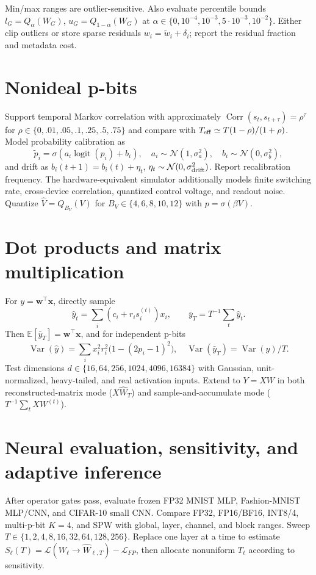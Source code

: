 \documentclass[11pt]{article}
\newcommand{\E}{\mathbb{E}}
\newcommand{\Var}{\operatorname{Var}}
\begin{document}
Min/max ranges are outlier-sensitive. Also evaluate percentile bounds $l_G=Q_\alpha(W_G)$,
$u_G=Q_{1-\alpha}(W_G)$ at $\alpha\in\{0,10^{-4},10^{-3},5\cdot10^{-3},10^{-2}\}$.
Either clip outliers or store sparse residuals $w_i=\tilde w_i+\delta_i$; report the
residual fraction and metadata cost.

\section{Nonideal p-bits}
Support temporal Markov correlation with approximately
$\operatorname{Corr}(s_t,s_{t+\tau})=\rho^\tau$ for
$\rho\in\{0,.01,.05,.1,.25,.5,.75\}$ and compare with
$T_{\rm eff}\simeq T(1-\rho)/(1+\rho)$. Model probability calibration as
\begin{equation}
 \tilde p_i=\sigma(a_i\operatorname{logit}(p_i)+b_i),\quad
 a_i\sim\mathcal N(1,\sigma_a^2),\quad b_i\sim\mathcal N(0,\sigma_b^2),
\end{equation}
and drift as $b_i(t+1)=b_i(t)+\eta_t$, $\eta_t\sim\mathcal N(0,\sigma_{\rm drift}^2)$.
Report recalibration frequency. The hardware-equivalent simulator additionally models
finite switching rate, cross-device correlation, quantized control voltage, and readout
noise. Quantize $\hat V=Q_{B_V}(V)$ for $B_V\in\{4,6,8,10,12\}$ with
$p=\sigma(\beta V)$.

\section{Dot products and matrix multiplication}
For $y=\mathbf w^\top\mathbf x$, directly sample
\begin{equation}
 \hat y_t=\sum_i(c_i+r_is_i^{(t)})x_i,\qquad
 \bar y_T=T^{-1}\sum_t\hat y_t.
\end{equation}
Then $\E[\bar y_T]=\mathbf w^\top\mathbf x$, and for independent p-bits
\begin{equation}
 \Var(\hat y)=\sum_i x_i^2r_i^2\bigl(1-(2p_i-1)^2\bigr),\quad
 \Var(\bar y_T)=\Var(\hat y)/T.
\end{equation}
Test dimensions $d\in\{16,64,256,1024,4096,16384\}$ with Gaussian,
unit-normalized, heavy-tailed, and real activation inputs. Extend to $Y=XW$ in both
reconstructed-matrix mode ($X\hat W_T$) and sample-and-accumulate mode
($T^{-1}\sum_tXW^{(t)}$).

\section{Neural evaluation, sensitivity, and adaptive inference}
After operator gates pass, evaluate frozen FP32 MNIST MLP, Fashion-MNIST MLP/CNN, and
CIFAR-10 small CNN. Compare FP32, FP16/BF16, INT8/4, multi-p-bit $K=4$, and SPW with
global, layer, channel, and block ranges. Sweep $T\in\{1,2,4,8,16,32,64,128,256\}$.
Replace one layer at a time to estimate
$S_\ell(T)=\mathcal L(W_\ell\to\hat W_{\ell,T})-\mathcal L_{FP}$, then allocate
nonuniform $T_\ell$ according to sensitivity.
\end{document}

